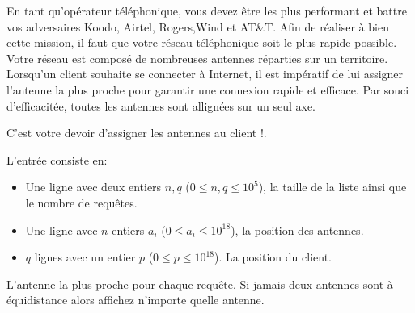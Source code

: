 

\newcommand{\maxa}{123456789}

En tant qu'opérateur téléphonique, vous devez être les plus performant et battre vos adversaires Koodo, Airtel, Rogers,Wind et AT\&T. Afin de réaliser à bien cette mission, il faut que votre réseau téléphonique soit le plus rapide possible. Votre réseau est composé de nombreuses antennes réparties sur un territoire. Lorsqu'un client souhaite se connecter à Internet, il est impératif de lui assigner l'antenne la plus proche pour garantir une connexion rapide et efficace. Par souci d'efficacitée, toutes les antennes sont allignées sur un seul axe.

C'est votre devoir d'assigner les antennes au client !.

\begin{Input}
    L'entrée consiste en:
    \begin{itemize}
        \item Une ligne avec deux entiers $n, q$ ($0\leq n, q\leq 10^5$), la taille de la liste ainsi que le nombre de requêtes.
        \item Une ligne avec $n$ entiers $a_i$ ($0  \leq a_i \leq 10^{18}$), la position des antennes.
        \item $q$ lignes avec un entier $p$ ($0 \leq p \leq 10^{18}$). La position du client.
    \end{itemize}
\end{Input}

\begin{Output}
    L'antenne la plus proche pour chaque requête. Si jamais deux antennes sont à équidistance alors affichez n'importe quelle antenne.
\end{Output}
